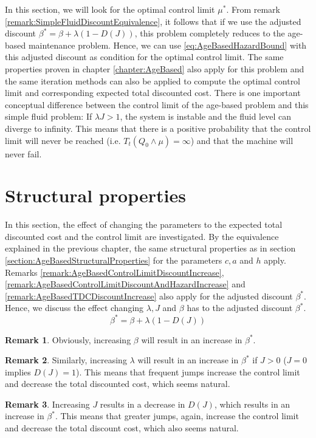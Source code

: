\documentclass[a4paper]{thesis}
\theoremstyle{definition}
\newtheorem{remark}{Remark}[chapter]
\begin{document}
In this section, we will look for the optimal control limit $\mu^*$.
From remark \ref{remark:SimpleFluidDiscountEquivalence}, it follows that if we use the adjusted discount $\beta^*=\beta+\lambda(1-D(J))$, this problem completely reduces to the age-based maintenance problem.
Hence, we can use \eqref{eq:AgeBasedHazardBound} with this adjusted discount as condition for the optimal control limit.
The same properties proven in chapter \ref{chapter:AgeBased} also apply for this problem and the same iteration methods can also be applied to compute the optimal control limit and corresponding expected total discounted cost.
There is one important conceptual difference between the control limit of the age-based problem and this simple fluid problem:
If $\lambda J>1$, the system is instable and the fluid level can diverge to infinity.
This means that there is a positive probability that the control limit will never be reached (i.e. $T_t(Q_0\wedge\mu)=\infty$) and that the machine will never fail. \section{Structural properties}
In this section, the effect of changing the parameters to the expected total discounted cost and the control limit are investigated.
By the equivalence explained in the previous chapter, the same structural properties as in section \ref{section:AgeBasedStructuralProperties} for the parameters $c,a$ and $h$ apply.
Remarks \ref{remark:AgeBasedControlLimitDiscountIncrease}, \ref{remark:AgeBasedControlLimitDiscountAndHazardIncrease} and \ref{remark:AgeBasedTDCDiscountIncrease} also apply for the adjusted discount $\beta^*$.
Hence, we discuss the effect changing $\lambda,J$ and $\beta$ has to the adjusted discount $\beta^*$.
\[
\beta^*=\beta+\lambda(1-D(J))
\]
\begin{remark}
	Obviously, increasing $\beta$ will result in an increase in $\beta^*$.
\end{remark}
\begin{remark}
Similarly, increasing $\lambda$ will result in an increase in $\beta^*$ if $J>0$ ($J=0$ implies $D(J)=1$).
This means that frequent jumps increase the control limit and decrease the total discounted cost, which seems natural.
\end{remark}
\begin{remark}
	Increasing $J$ results in a decrease in $D(J)$, which results in an increase in $\beta^*$.
	This means that greater jumps, again, increase the control limit and decrease the total discount cost, which also seems natural.
\end{remark}
\end{document}
